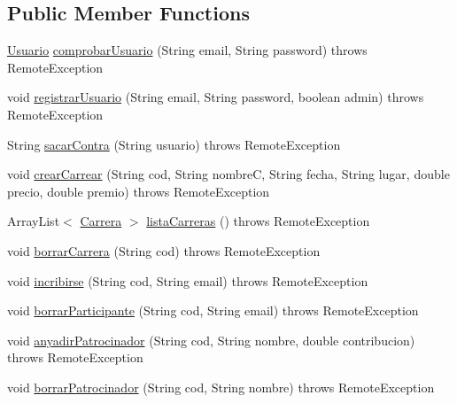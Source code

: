 \subsection*{Public Member Functions}
\begin{DoxyCompactItemize}
\item 
\mbox{\hyperlink{classes_1_1deusto_1_1server_1_1jdo_1_1_usuario}{Usuario}} \mbox{\hyperlink{interfacees_1_1deusto_1_1server_1_1_i_server_a864d05d99ec3891208c39d8352221656}{comprobar\+Usuario}} (String email, String password)  throws Remote\+Exception
\item 
void \mbox{\hyperlink{interfacees_1_1deusto_1_1server_1_1_i_server_af6743c655c7831fa6d87e6e910bb6db4}{registrar\+Usuario}} (String email, String password, boolean admin)  throws Remote\+Exception
\item 
String \mbox{\hyperlink{interfacees_1_1deusto_1_1server_1_1_i_server_a950b819a4f67edf0ef76221dd4714d47}{sacar\+Contra}} (String usuario)  throws Remote\+Exception
\item 
void \mbox{\hyperlink{interfacees_1_1deusto_1_1server_1_1_i_server_a3cb0049dde89f2d81fcc883b19a0c6cf}{crear\+Carrear}} (String cod, String nombreC, String fecha, String lugar, double precio, double premio)  throws Remote\+Exception
\item 
Array\+List$<$ \mbox{\hyperlink{classes_1_1deusto_1_1server_1_1jdo_1_1_carrera}{Carrera}} $>$ \mbox{\hyperlink{interfacees_1_1deusto_1_1server_1_1_i_server_a13c17b07c8114d16130053aecdd455bb}{lista\+Carreras}} ()  throws Remote\+Exception
\item 
void \mbox{\hyperlink{interfacees_1_1deusto_1_1server_1_1_i_server_aaf52191bb3f870f0fcbdd58ffa7bd9c7}{borrar\+Carrera}} (String cod)  throws Remote\+Exception
\item 
void \mbox{\hyperlink{interfacees_1_1deusto_1_1server_1_1_i_server_ab6f6b6b646a79a330ab0b2174d77db44}{incribirse}} (String cod, String email)  throws Remote\+Exception
\item 
void \mbox{\hyperlink{interfacees_1_1deusto_1_1server_1_1_i_server_ac833d9018ade9c49677942317f270046}{borrar\+Participante}} (String cod, String email)  throws Remote\+Exception
\item 
void \mbox{\hyperlink{interfacees_1_1deusto_1_1server_1_1_i_server_a50aa44ec5681089479d0793086a748a1}{anyadir\+Patrocinador}} (String cod, String nombre, double contribucion)  throws Remote\+Exception
\item 
void \mbox{\hyperlink{interfacees_1_1deusto_1_1server_1_1_i_server_a905d4eb57bc276240c23f5ebb0f08bea}{borrar\+Patrocinador}} (String cod, String nombre)  throws Remote\+Exception
\end{DoxyCompactItemize}


